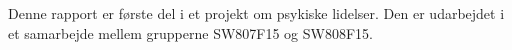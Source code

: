 Denne rapport er første del i et projekt om psykiske lidelser.
Den er udarbejdet i et samarbejde mellem grupperne SW807F15 og SW808F15.
